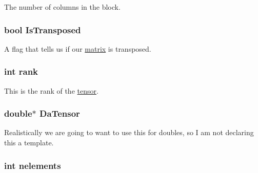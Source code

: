 The number of columns in the block. \hypertarget{classJKBuilder_1_1matrix_a77fa48e57c519482de2ec7ec182b16ef}{
\subsubsection[{IsTransposed}]{\setlength{\rightskip}{0pt plus 5cm}bool {\bf IsTransposed}}}
\label{classJKBuilder_1_1matrix_a77fa48e57c519482de2ec7ec182b16ef}


A flag that tells us if our \hyperlink{classJKBuilder_1_1matrix}{matrix} is transposed. \hypertarget{classJKBuilder_1_1tensor_a6cfd95afd0afebd625b889fb6e58371c}{
\subsubsection[{rank}]{\setlength{\rightskip}{0pt plus 5cm}int {\bf rank}}}
\label{classJKBuilder_1_1tensor_a6cfd95afd0afebd625b889fb6e58371c}


This is the rank of the \hyperlink{classJKBuilder_1_1tensor}{tensor}. \hypertarget{classJKBuilder_1_1tensor_a91f7b1e58c0e5d1a49ddb8b80ab7790e}{
\subsubsection[{DaTensor}]{\setlength{\rightskip}{0pt plus 5cm}double$\ast$ {\bf DaTensor}}}
\label{classJKBuilder_1_1tensor_a91f7b1e58c0e5d1a49ddb8b80ab7790e}


Realistically we are going to want to use this for doubles, so I am not declaring this a template. \hypertarget{classJKBuilder_1_1tensor_a23ae6a00bed19d2ad34d439636e797da}{
\subsubsection[{nelements}]{\setlength{\rightskip}{0pt plus 5cm}int {\bf nelements}}}
\label{classJKBuilder_1_1tensor_a23ae6a00bed19d2ad34d439636e797da}


